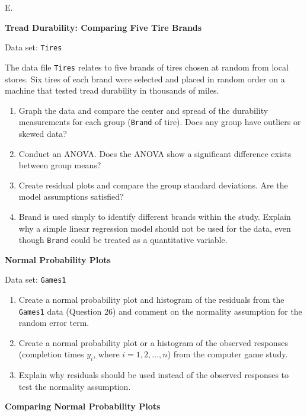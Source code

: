 \documentclass[
]{report}
\newcounter{excount}
\renewcommand{\theexcount}{E\arabic{excount}}
\begin{document}
\begin{list}{\theexcount.}{ \setlength{\itemsep}{1.2em}}
  \item \textbf{Tread Durability: Comparing Five Tire Brands}

Data set: \texttt{Tires}

The data file \texttt{Tires} relates to five brands of tires chosen at random from local stores. Six tires of each brand were selected and placed in random order on a machine that tested tread durability in thousands of miles.

    \begin{enumerate}
      \item Graph the data and compare the center and spread of the durability measurements for each group (\texttt{Brand} of tire). Does any group have outliers or skewed data?
      \item Conduct an ANOVA. Does the ANOVA show a significant difference exists between group means?
      \item Create residual plots and compare the group standard deviations. Are the model assumptions satisfied?
      \item Brand is used simply to identify different brands within the study. Explain why a simple linear regression model should not be used for the data, even though \texttt{Brand} could be treated as a quantitative variable.
    \end{enumerate}

  \item \textbf{Normal Probability Plots}

Data set: \texttt{Games1}

    \begin{enumerate}
      \item Create a normal probability plot and histogram of the residuals from the \texttt{Games1} data (Question 26) and comment on the normality assumption for the random error term.
      \item Create a normal probability plot or a histogram of the observed responses (completion times $y_i$, where $i = 1, 2, \ldots, n$) from the computer game study.
      \item Explain why residuals should be used instead of the observed responses to test the normality assumption.
    \end{enumerate}

  \item \textbf{Comparing Normal Probability Plots}


\end{list}
\end{document}
